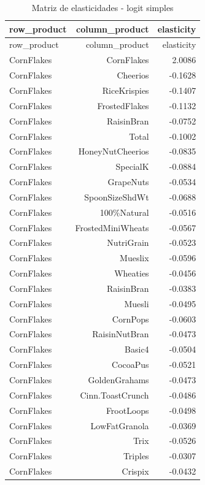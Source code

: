 \begingroup
\scriptsize
\begin{longtable}{@{}lrr@{}}
\caption{Matriz de elasticidades - logit simples}\label{tab:elas-simple}\\
\toprule
row\_product & column\_product & elasticity \\
\midrule
\endfirsthead
\toprule
row\_product & column\_product & elasticity \\
\midrule
\endhead
CornFlakes & CornFlakes & 2.0086 \\
CornFlakes & Cheerios & -0.1628 \\
CornFlakes & RiceKrispies & -0.1407 \\
CornFlakes & FrostedFlakes & -0.1132 \\
CornFlakes & RaisinBran & -0.0752 \\
CornFlakes & Total & -0.1002 \\
CornFlakes & HoneyNutCheerios & -0.0835 \\
CornFlakes & SpecialK & -0.0884 \\
CornFlakes & GrapeNuts & -0.0534 \\
CornFlakes & SpoonSizeShdWt & -0.0688 \\
CornFlakes & 100\%Natural & -0.0516 \\
CornFlakes & FrostedMiniWheats & -0.0567 \\
CornFlakes & NutriGrain & -0.0523 \\
CornFlakes & Mueslix & -0.0596 \\
CornFlakes & Wheaties & -0.0456 \\
CornFlakes & RaisinBran & -0.0383 \\
CornFlakes & Muesli & -0.0495 \\
CornFlakes & CornPops & -0.0603 \\
CornFlakes & RaisinNutBran & -0.0473 \\
CornFlakes & Basic4 & -0.0504 \\
CornFlakes & CocoaPus & -0.0521 \\
CornFlakes & GoldenGrahams & -0.0473 \\
CornFlakes & Cinn.ToastCrunch & -0.0486 \\
CornFlakes & FrootLoops & -0.0498 \\
CornFlakes & LowFatGranola & -0.0369 \\
CornFlakes & Trix & -0.0526 \\
CornFlakes & Triples & -0.0307 \\
CornFlakes & Crispix & -0.0432 \\

\end{longtable}
